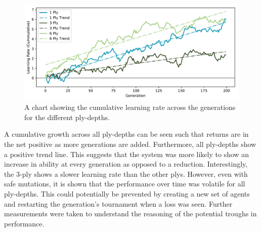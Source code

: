 \documentclass[12pt,a4paper]{article}
\begin{document}
    \begin{figure}[!ht]
        \centering
        \includegraphics[width=140mm]{images/results/combined_cummulative.pdf}
        \caption{A chart showing the cumulative learning rate across the generations for the different ply-depths.\label{cum_growth}}
    \end{figure}
    
    A cumulative growth across all ply-depths can be seen such that returns are in the net positive as more generations are added. Furthermore, all ply-depths show a positive trend line. This suggests that the system was more likely to show an increase in ability at every generation as opposed to a reduction. Interestingly, the 3-ply shows a slower learning rate than the other plys. However, even with safe mutations, it is shown that the performance over time was volatile for all ply-depths. This could potentially be prevented by creating a new set of agents and restarting the generation's tournament when a loss was seen. Further measurements were taken to understand the reasoning of the potential troughs in performance. 
    
\end{document}
